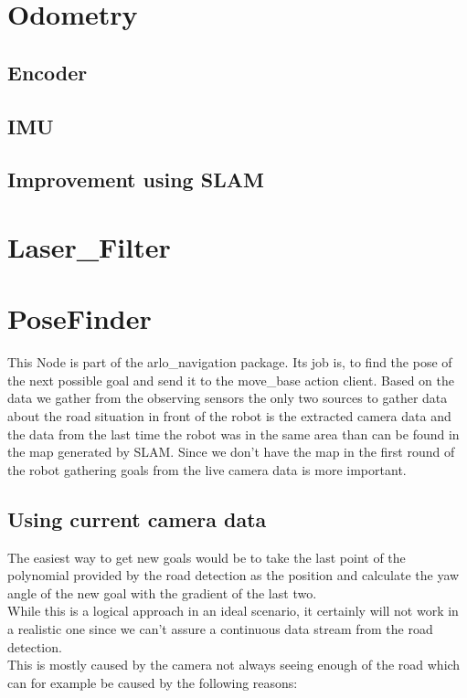 \section{Odometry}

\subsection{Encoder}
\subsection{IMU}
\subsection{Improvement using SLAM}

\section{Laser\_Filter}

\section{PoseFinder}
This Node is part of the arlo\_navigation package. Its job is, to find the pose of the next possible goal and send it to the move\_base action client.
Based on the data we gather from the observing sensors the only two sources to gather data about the road situation in front of the robot is the extracted camera data and the data from the last time the robot was in the same area than can be found in the map generated by SLAM.
Since we don't have the map in the first round of the robot gathering goals from the live camera data is more important. 
\subsection{Using current camera data}
The easiest way to get new goals would be to take the last point of the polynomial provided by the road detection as the position and calculate the yaw angle of the new goal with the gradient of the last two.\\

While this is a logical approach in an ideal scenario, it certainly will not work in a realistic one since we can't assure a continuous data stream from the road detection.\\

This is mostly caused by the camera not always seeing enough of the road which can for example be caused by the following reasons:

